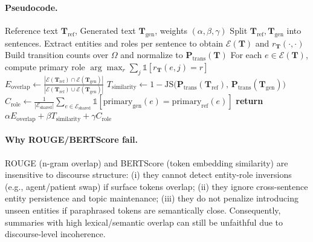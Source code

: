 \documentclass[11pt,a4paper]{article}
\begin{document}
\paragraph{Pseudocode.}
\begin{algorithm}[H]
\caption{Compute Entity Grid Faithfulness (EGF)}
\label{alg:egf}
\begin{algorithmic}[1]
\REQUIRE Reference text $\mathbf{T}_{\text{ref}}$, Generated text $\mathbf{T}_{\text{gen}}$, weights $(\alpha,\beta,\gamma)$
\STATE Split $\mathbf{T}_{\text{ref}}, \mathbf{T}_{\text{gen}}$ into sentences.
	\STATE Extract entities and roles per sentence to obtain $\mathcal{E}(\mathbf{T})$ and $r_\mathbf{T}(\cdot,\cdot)$
	\STATE Build transition counts over $\Omega$ and normalize to $\mathbf{P}_{\text{trans}}(\mathbf{T})$
	\STATE For each $e\in\mathcal{E}(\mathbf{T})$, compute primary role $\arg\max_r \sum_j \mathbb{1}[r_\mathbf{T}(e,j)=r]$
\ENDFOR
\STATE $E_{\text{overlap}} \leftarrow \frac{|\mathcal{E}(\mathbf{T}_{\text{ref}})\cap\mathcal{E}(\mathbf{T}_{\text{gen}})|}{|\mathcal{E}(\mathbf{T}_{\text{ref}})\cup\mathcal{E}(\mathbf{T}_{\text{gen}})|}$
\STATE $T_{\text{similarity}} \leftarrow 1 - \mathrm{JS}\big(\mathbf{P}_{\text{trans}}(\mathbf{T}_{\text{ref}}),\, \mathbf{P}_{\text{trans}}(\mathbf{T}_{\text{gen}})\big)$
\STATE $C_{\text{role}} \leftarrow \frac{1}{|\mathcal{E}_{\text{shared}}|}\sum_{e\in\mathcal{E}_{\text{shared}}} \mathbb{1}[\text{primary}_{\text{gen}}(e)=\text{primary}_{\text{ref}}(e)]$
\STATE \textbf{return} $\alpha E_{\text{overlap}} + \beta T_{\text{similarity}} + \gamma C_{\text{role}}$
\end{algorithmic}
\end{algorithm}

\paragraph{Why ROUGE/BERTScore fail.} ROUGE (n-gram overlap) and BERTScore (token embedding similarity) are insensitive to discourse structure: (i) they cannot detect entity-role inversions (e.g., agent/patient swap) if surface tokens overlap; (ii) they ignore cross-sentence entity persistence and topic maintenance; (iii) they do not penalize introducing unseen entities if paraphrased tokens are semantically close. Consequently, summaries with high lexical/semantic overlap can still be unfaithful due to discourse-level incoherence.
\end{document}
